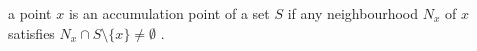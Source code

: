 a point  $ x $  is an accumulation point of a set  $ S $  if any
neighbourhood  $ N_x $  of  $ x $  satisfies
 $ N_x \cap S \setminus  \{x \} \neq  \emptyset $ .